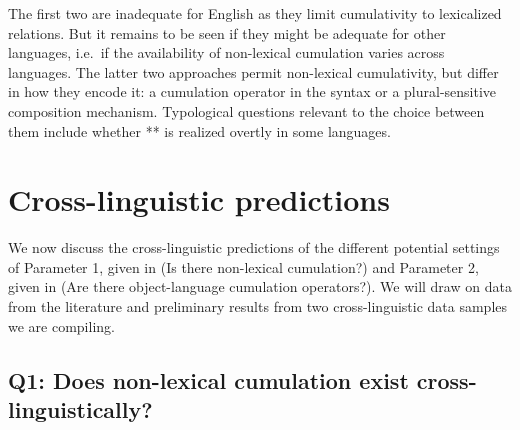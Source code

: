 \documentclass[output=paper]{langscibook}
\begin{document}
The first two are inadequate for English as they limit cumulativity to lexicalized relations. But it remains to be seen if they might be adequate for other languages, i.e.~if the availability of non-lexical cumulation varies across languages. The latter two approaches permit non-lexical cumulativity, but differ in how they encode it: a cumulation operator in the syntax or a plural-sensitive composition mechanism. Typological questions relevant to the choice between them include whether ** is realized overtly in some languages. 

\section{Cross-linguistic predictions}\label{has-sch:sec:3}

We now discuss the cross-linguistic predictions of the different potential settings of Parameter 1, given in  (Is there non-lexical cumulation?) and Parameter 2, given in  (Are there object-language cumulation operators?). We  will draw on data from the literature and preliminary results from two cross-linguistic data samples we are compiling.


\subsection{Q1: Does non-lexical cumulation exist cross-linguistically?} \label{has-sch:sec:3.1}\largerpage
\end{document}
